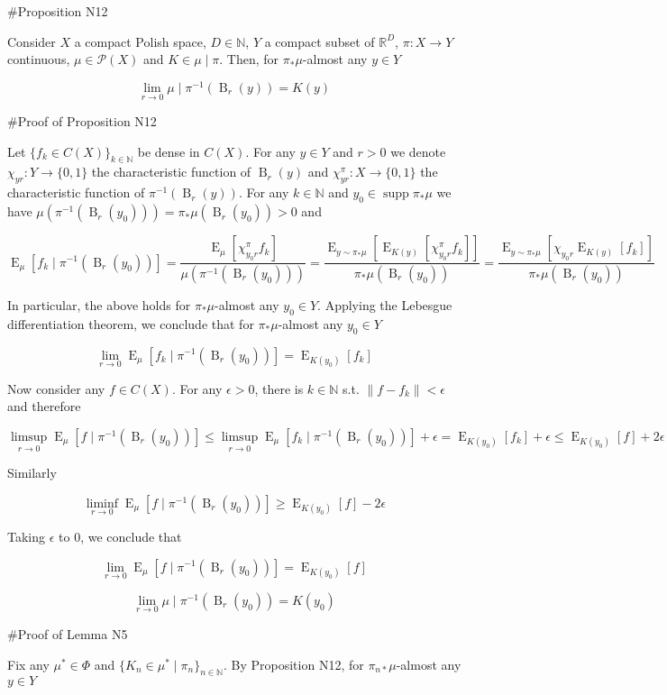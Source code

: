 \documentclass[a4paper]{article}
\newcommand{\Bool}{\{0,1\}}
\DeclareMathOperator{\Supp}{supp}
\DeclareMathOperator{\E}{E}
\newcommand{\Nats}{\mathbb{N}}
\newcommand{\Reals}{\mathbb{R}}
\newcommand{\Sq}[2]{\{#1\}_{#2 \in \Nats}}
\newcommand{\Sqn}[1]{\Sq{#1}{n}}
\newcommand{\Norm}[1]{\lVert #1 \rVert}
\newcommand{\Prob}{\mathcal{P}}
\newcommand{\Ball}{\operatorname{B}}
\begin{document}
\#Proposition N12

Consider $X$ a compact Polish space, $D \in \Nats$, $Y$ a compact subset of $\Reals^D$, $\pi: X \rightarrow Y$ continuous, $\mu \in \Prob(X)$ and $K \in \mu \mid \pi$. Then, for $\pi_* \mu$-almost any $y \in Y$

$$\lim_{r \rightarrow 0} \mu \mid \pi^{-1}(\Ball_r(y)) = K(y)$$

\#Proof of Proposition N12

Let $\Sq{f_k \in C(X)}{k}$ be dense in $C(X)$. For any $y \in Y$ and $r > 0$ we denote $\chi_{yr}: Y \rightarrow \Bool$ the characteristic function of $\Ball_r(y)$ and $\chi^\pi_{yr}: X \rightarrow \Bool$ the characteristic function of $\pi^{-1}(\Ball_r(y))$. For any $k \in \Nats$ and $y_0 \in \Supp \pi_* \mu$ we have $\mu(\pi^{-1}(\Ball_r(y_0))) = \pi_*\mu(\Ball_r(y_0)) > 0$ and

$$\E_{\mu}[f_k \mid \pi^{-1}(\Ball_r(y_0))] = \frac{\E_{\mu}[\chi^\pi_{y_0r} f_k]}{\mu(\pi^{-1}(\Ball_r(y_0)))} = \frac{\E_{y \sim \pi_* \mu}[\E_{K(y)}[\chi^\pi_{y_0r} f_k]]}{\pi_*\mu(\Ball_r(y_0))} = \frac{\E_{y \sim \pi_* \mu}[\chi_{y_0r} \E_{K(y)}[f_k]]}{\pi_*\mu(\Ball_r(y_0))}$$

In particular, the above holds for $\pi_* \mu$-almost any $y_0 \in Y$. Applying the Lebesgue differentiation theorem, we conclude that for $\pi_* \mu$-almost any $y_0 \in Y$

$$\lim_{r \rightarrow 0} \E_{\mu}[f_k \mid \pi^{-1}(\Ball_r(y_0))] = \E_{K(y_0)}[f_k]$$

Now consider any $f \in C(X)$. For any $\epsilon > 0$, there is $k \in \Nats$ s.t. $\Norm{f-f_k} < \epsilon$ and therefore

$$\limsup_{r \rightarrow 0} \E_{\mu}[f \mid \pi^{-1}(\Ball_r(y_0))] \leq \limsup_{r \rightarrow 0} \E_{\mu}[f_k \mid \pi^{-1}(\Ball_r(y_0))] + \epsilon = \E_{K(y_0)}[f_k] + \epsilon  \leq \E_{K(y_0)}[f] + 2\epsilon$$

Similarly

$$\liminf_{r \rightarrow 0} \E_{\mu}[f \mid \pi^{-1}(\Ball_r(y_0))] \geq \E_{K(y_0)}[f] - 2\epsilon$$

Taking $\epsilon$ to 0, we conclude that

$$\lim_{r \rightarrow 0} \E_{\mu}[f \mid \pi^{-1}(\Ball_r(y_0))] = \E_{K(y_0)}[f]$$

$$\lim_{r \rightarrow 0} \mu \mid \pi^{-1}(\Ball_r(y_0)) = K(y_0)$$

\#Proof of Lemma N5

Fix any $\mu^* \in \Phi$ and $\Sqn{K_n \in \mu^* \mid \pi_n}$. By Proposition N12, for $\pi_{n*} \mu$-almost any $y \in Y$
\end{document}
